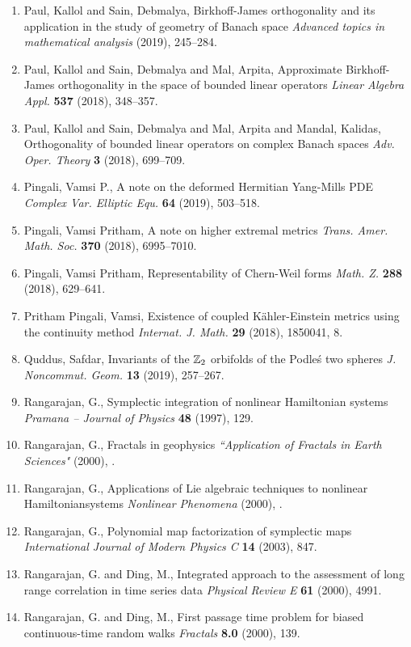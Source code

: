 \begin{enumerate}
\item Paul, Kallol and Sain, Debmalya, Birkhoff-{J}ames orthogonality and its application in the
study of geometry of {B}anach space {\em Advanced topics in mathematical analysis} {\bf } (2019), 245--284.
\item Paul, Kallol and Sain, Debmalya and Mal, Arpita, Approximate {B}irkhoff-{J}ames orthogonality in the space of
bounded linear operators {\em Linear Algebra Appl.} {\bf 537} (2018), 348--357.
\item Paul, Kallol and Sain, Debmalya and Mal, Arpita and Mandal,
Kalidas, Orthogonality of bounded linear operators on complex {B}anach
spaces {\em Adv. Oper. Theory} {\bf 3} (2018), 699--709.
\item Pingali, Vamsi P., A note on the deformed {H}ermitian {Y}ang-{M}ills {PDE} {\em Complex Var. Elliptic Equ.} {\bf 64} (2019), 503--518.
\item Pingali, Vamsi Pritham, A note on higher extremal metrics {\em Trans. Amer. Math. Soc.} {\bf 370} (2018), 6995--7010.
\item Pingali, Vamsi Pritham, Representability of {C}hern-{W}eil forms {\em Math. Z.} {\bf 288} (2018), 629--641.
\item Pritham Pingali, Vamsi, Existence of coupled {K}\"{a}hler-{E}instein metrics using the
continuity method {\em Internat. J. Math.} {\bf 29} (2018), 1850041, 8.
\item Quddus, Safdar, Invariants of the {$\Bbb Z_2$} orbifolds of the {P}odle\'{s} two
spheres {\em J. Noncommut. Geom.} {\bf 13} (2019), 257--267.
\item Rangarajan, G., Symplectic integration of nonlinear Hamiltonian systems {\em Pramana -- Journal of Physics} {\bf 48} (1997), 129.
\item Rangarajan, G., Fractals in geophysics {\em “Application of Fractals in Earth Sciences"} {\bf } (2000), .
\item Rangarajan, G., Applications of Lie algebraic techniques to nonlinear Hamiltoniansystems {\em Nonlinear Phenomena} {\bf } (2000), .
\item Rangarajan, G., Polynomial map factorization of symplectic maps {\em International Journal of Modern Physics C} {\bf 14} (2003), 847.
\item Rangarajan, G. and Ding, M., Integrated approach to the assessment of long range correlation in time series data {\em Physical Review E} {\bf 61} (2000), 4991.
\item Rangarajan, G. and Ding, M., First passage time problem for biased continuous-time random walks {\em Fractals} {\bf 8.0} (2000), 139.

\end{enumerate}
